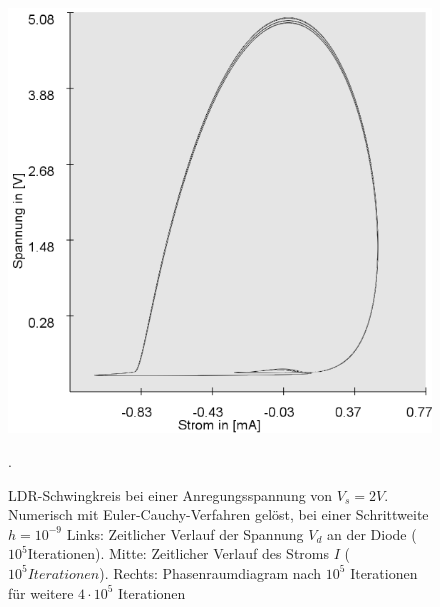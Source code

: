 \documentclass{scrartcl}
\begin{document}
\begin{figure}
\includegraphics[scale=0.28]{V_s-2V}
\caption{LDR-Schwingkreis bei einer Anregungsspannung von $V_s=2V$. Numerisch mit Euler-Cauchy-Verfahren gelöst, bei einer Schrittweite $h=10^{-9}$ Links: Zeitlicher Verlauf der Spannung $V_d$ an der Diode ($10^5$Iterationen). Mitte: Zeitlicher Verlauf des Stroms $I$ ($10^5 Iterationen$). Rechts: Phasenraumdiagram nach $10^5$ Iterationen für weitere $4 \cdot 10^5$ Iterationen }. 
\label{fig:ldr_v2}
\end{figure}
\end{document}
